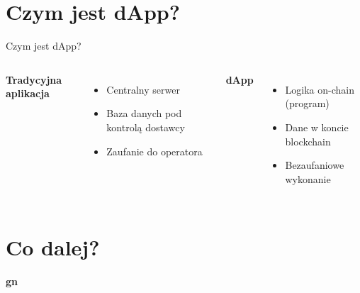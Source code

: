 \section{Czym jest dApp?}

\begin{frame}{Czym jest dApp?}
  \begin{columns}
      \textbf{Tradycyjna aplikacja}
      \begin{itemize}
        \item Centralny serwer
        \item Baza danych pod kontrolą dostawcy
        \item Zaufanie do operatora
      \end{itemize}

      \textbf{dApp}
      \begin{itemize}
        \item Logika on-chain (program)
        \item Dane w koncie blockchain
        \item Bezaufaniowe wykonanie
      \end{itemize}
  \end{columns}
\end{frame}

\section{Co dalej?}

\begin{frame}[plain]
  \begin{center}
    \vfill
    {\Huge\bfseries\color{stplwhite} gn}
    \vfill
  \end{center}
\end{frame}


